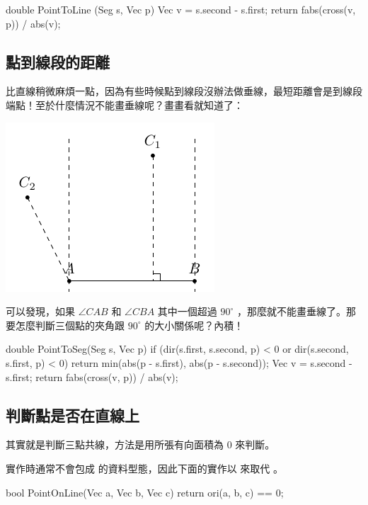 \documentclass[main.tex]{subfiles}
\begin{document}
\begin{C++}
double PointToLine (Seg s, Vec p) {
	Vec v = s.second - s.first;
	return fabs(cross(v, p)) / abs(v);
}
\end{C++}

\subsection{點到線段的距離}

比直線稍微麻煩一點，因為有些時候點到線段沒辦法做垂線，最短距離會是到線段端點！至於什麼情況不能畫垂線呢？畫畫看就知道了：
\begin{center}
	\includegraphics*{images/Geometry/Basic/PointToSeg.pdf}
\end{center}

可以發現，如果 $\angle CAB$ 和 $\angle CBA$ 其中一個超過 $90 ^ \circ$ ，那麼就不能畫垂線了。那要怎麼判斷三個點的夾角跟 $90 ^ \circ$ 的大小關係呢？內積！

\begin{C++}
double PointToSeg(Seg s, Vec p) {
	if (dir(s.first, s.second, p) < 0 or
			dir(s.second, s.first, p) < 0)
		return min(abs(p - s.first), abs(p - s.second));
	Vec v = s.second - s.first;
	return fabs(cross(v, p)) / abs(v);
}
\end{C++}

\subsection{判斷點是否在直線上}

其實就是判斷三點共線，方法是用所張有向面積為 $0$ 來判斷。

實作時通常不會包成  的資料型態，因此下面的實作以  來取代  。

\begin{C++}
bool PointOnLine(Vec a, Vec b, Vec c)
{ return ori(a, b, c) == 0; }
\end{C++}
\end{document}
